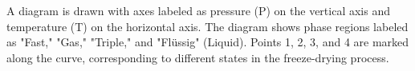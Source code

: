 A diagram is drawn with axes labeled as pressure (P) on the vertical axis and temperature (T) on the horizontal axis. The diagram shows phase regions labeled as "Fast," "Gas," "Triple," and "Flüssig" (Liquid). Points 1, 2, 3, and 4 are marked along the curve, corresponding to different states in the freeze-drying process.